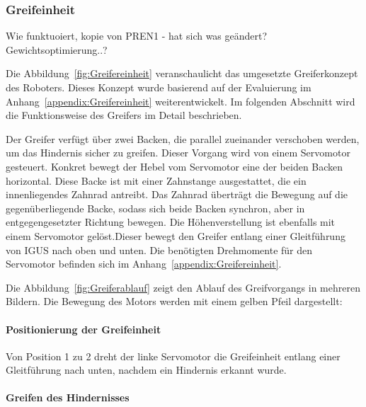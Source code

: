 \documentclass[main.tex]{subfiles} %
\begin{document}

\subsubsection{Greifeinheit}

Wie funktuoiert, kopie von PREN1 - hat sich was geändert?
Gewichtsoptimierung..?

Die Abbildung~\ref{fig:Greifereinheit} veranschaulicht das umgesetzte Greiferkonzept des Roboters. Dieses Konzept wurde basierend auf der Evaluierung 
im Anhang~\ref{appendix:Greifereinheit} weiterentwickelt. Im folgenden Abschnitt wird die Funktionsweise des Greifers im Detail beschrieben.



Der Greifer verfügt über zwei Backen, die parallel zueinander verschoben werden, um das Hindernis sicher zu greifen. 
Dieser Vorgang wird von einem Servomotor gesteuert. Konkret bewegt der Hebel vom Servomotor eine der beiden Backen horizontal. 
Diese Backe ist mit einer Zahnstange ausgestattet, die ein innenliegendes Zahnrad antreibt. Das Zahnrad überträgt die 
Bewegung auf die gegenüberliegende Backe, sodass sich beide Backen synchron, aber in entgegengesetzter Richtung bewegen. 
Die Höhenverstellung ist ebenfalls mit einem Servomotor gelöst.Dieser bewegt den Greifer entlang einer Gleitführung von IGUS 
nach oben und unten. Die benötigten Drehmomente für den Servomotor befinden sich im Anhang~\ref{appendix:Greifereinheit}.

\newpage

Die Abbildung~\ref{fig:Greiferablauf} zeigt den Ablauf des Greifvorgangs in mehreren Bildern. Die Bewegung des Motors werden mit einem gelben Pfeil dargestellt:

\paragraph{Positionierung der Greifeinheit} 
Von Position 1 zu 2 dreht der linke Servomotor die Greifeinheit entlang einer Gleitführung nach unten, nachdem ein Hindernis erkannt wurde.

\paragraph{Greifen des Hindernisses} 
\end{document}
